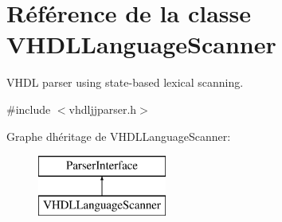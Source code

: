 \hypertarget{class_v_h_d_l_language_scanner}{}\section{Référence de la classe V\+H\+D\+L\+Language\+Scanner}
\label{class_v_h_d_l_language_scanner}


V\+H\+D\+L parser using state-\/based lexical scanning.  




{\ttfamily \#include $<$vhdljjparser.\+h$>$}

Graphe d\textquotesingle{}héritage de V\+H\+D\+L\+Language\+Scanner\+:\begin{figure}[H]
\begin{center}
\leavevmode
\includegraphics[height=2.000000cm]{class_v_h_d_l_language_scanner}
\end{center}
\end{figure}

